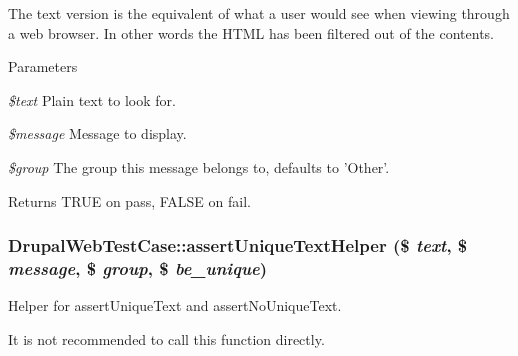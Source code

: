 The text version is the equivalent of what a user would see when viewing through a web browser. In other words the HTML has been filtered out of the contents.


\begin{DoxyParams}{Parameters}
\item[{\em \$text}]Plain text to look for. \item[{\em \$message}]Message to display. \item[{\em \$group}]The group this message belongs to, defaults to 'Other'. \end{DoxyParams}
\begin{DoxyReturn}{Returns}
TRUE on pass, FALSE on fail. 
\end{DoxyReturn}
\hypertarget{class_drupal_web_test_case_aa853442f9c99a2205c56db88065b58b5}{
\subsubsection[{assertUniqueTextHelper}]{\setlength{\rightskip}{0pt plus 5cm}DrupalWebTestCase::assertUniqueTextHelper (\$ {\em text}, \/  \$ {\em message}, \/  \$ {\em group}, \/  \$ {\em be\_\-unique})}}
\label{class_drupal_web_test_case_aa853442f9c99a2205c56db88065b58b5}
Helper for assertUniqueText and assertNoUniqueText.

It is not recommended to call this function directly.


